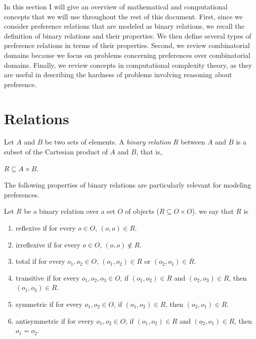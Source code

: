 
In this section I will give an overview of
mathematical and computational concepts
that we will use throughout the rest of this document. 
First, since we consider preference relations that are modeled
as binary relations,
we recall the definition of binary relations and their
properties.
We then define several types of preference relations in terms of
their properties.
Second, we review combinatorial domains because we focus on
problems concerning preferences over combinatorial domains.
Finally, we review concepts in computational complexity theory,
as they are useful in describing the hardness of problems
involving reasoning about preference.

\section{Relations \label{sec:relations}}


\begin{definition}
	Let $A$ and $B$ be two sets of elements.  A \textit{binary relation} $R$ between $A$ and $B$
	is a subset of the Cartesian product of $A$ and $B$, that is,
	\begin{center}
		$R \subseteq A \times B$.
	\end{center}
\end{definition}


The following properties of binary relations are particularly relevant for modeling preferences.
\begin{definition}
	Let $R$ be a binary relation over a set $O$ of objects ($R \subseteq O \times O$).
	we say that $R$ is
	\begin{enumerate} \itemsep -4pt
		\item reflexive if for every $o \in O$, $(o,o) \in R$.
		\item irreflexive if for every $o \in O$, $(o,o) \not \in R$.
		\item total if for every $o_1,o_2 \in O$, $(o_1,o_2) \in R$ or $(o_2,o_1) \in R$.
		\item transitive if for every $o_1,o_2,o_3 \in O$, if $(o_1,o_2) \in R$ and $(o_2,o_3) \in R$, 
					then $(o_1,o_3) \in R$.
		\item symmetric if for every $o_1,o_2 \in O$, if $(o_1,o_2) \in R$, then $(o_2,o_1) \in R$.
		\item antisymmetric if for every $o_1,o_2 \in O$, if $(o_1,o_2) \in R$ and $(o_2,o_1) \in R$, then $o_1=o_2$.
	\end{enumerate}
\end{definition}

